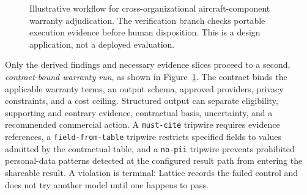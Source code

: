 \documentclass[conference]{IEEEtran}
\newcommand{\code}[1]{\texttt{\small #1}}
\begin{document}
\begin{figure}[t]
\centering
{}
\caption{Illustrative workflow for cross-organizational aircraft-component
warranty adjudication. The verification branch checks portable execution
evidence before human disposition. This is a design application, not a deployed
evaluation.}
\label{fig:aviation-warranty}
\end{figure}

Only the derived findings and necessary evidence slices proceed to a second,
\emph{contract-bound warranty run}, as shown in
Figure~\ref{fig:aviation-warranty}. The contract binds the applicable warranty
terms, an output schema, approved providers, privacy constraints, and a cost
ceiling. Structured output can separate eligibility, supporting and contrary
evidence, contractual basis, uncertainty, and a recommended commercial action.
A \code{must-cite} tripwire requires evidence references, a
\code{field-from-table} tripwire restricts specified fields to values admitted
by the contractual table, and a \code{no-pii} tripwire prevents prohibited
personal-data patterns detected at the configured result path from entering the
shareable result. A violation is terminal:
Lattice records the failed control and does not try another model until one
happens to pass.
\end{document}
